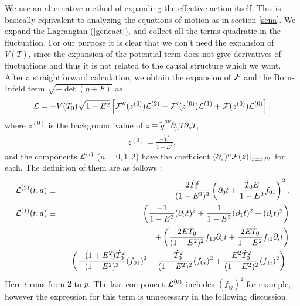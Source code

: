 \documentclass[a4paper,12pt]{article}
\newcommand{\p}{\partial}
\begin{document}
We use an alternative method of expanding the effective action itself. 
This is basically equivalent to analyzing the equations of motion 
as in section \ref{sena}. 
We expand the Lagrangian (\ref{geneact}), and collect all the terms
quadratic in the fluctuation. For our purpose it is clear that we don't
need the expansion of $V(T)$, since the expansion of the potential term
does not give derivatives of fluctuations and thus it is not related to
the causal structure which we want. 
After a straightforward calculation, we
obtain the expansion of ${\cal F}$ and the Born-Infeld term 
$\sqrt{-\det (\eta + F)}$ as
\begin{eqnarray}
 {\cal L} = -V(T_0)\sqrt{1-E^2}
\left[
 {\cal F}''(z^{(0)}) 
{\cal L}^{(2)} 
+ {\cal F}'(z^{(0)}) {\cal L}^{(1)}
+ {\cal F}(z^{(0)}) {\cal L}^{(0)}
\right],
\label{fl2a}
\end{eqnarray}
where $z^{(0)}$ is the background value of 
$z\equiv \widetilde{g}^{\mu\nu} \p_\mu T \p_\nu T$, 
\begin{eqnarray}
 z^{(0)} = \frac{-\dot{T}_0^2}{1-E^2},
\end{eqnarray}
and the components ${\cal L}^{(i)}$ ($n=0,1,2$) have the coefficient
$(\p_z)^n{\cal F}(z)|_{z=z^{(0)}}$ for each. 
The definition of them are as follows : 
\begin{eqnarray}
{\cal L}^{(2)}(t,a) 
& \equiv  &
\frac{2 \dot{T}_0^2}{(1-E^2)^2} \left(
\p_0 t + \frac{\dot{T}_0 E}{1-E^2}f_{01}
\right)^2, 
\label{l2}
\\
{\cal L}^{(1)}(t,a) &\equiv &
\left(
\frac{-1}{1-E^2}(\p_0 t)^2
+ \frac{1}{1-E^2}(\p_1 t)^2
+ (\p_i t)^2
\right) 
\nonumber
\\ 
& & +
\left(\frac{2E\dot{T}_0}{(1-E^2)^2} f_{10} \p_0 t
   +\frac{2E\dot{T}_0}{1-E^2} f_{i1} \p_i t \right)
\label{l1}
\\ 
& & 
+ 
\left(
\frac{-(1+E^2)\dot{T}_0^2}{(1-E^2)^3} (f_{01})^2
+\frac{-\dot{T}_0^2}{(1-E^2)^2} (f_{0i})^2
+\frac{E^2\dot{T}_0^2}{(1-E^2)^2} (f_{1i})^2
\right).
\nonumber
\end{eqnarray}
Here $i$ runs from $2$ to  $p$. 
The last component ${\cal L}^{(0)}$ includes $(f_{ij})^2$ for example,
however the expression for this term is unnecessary in the following
discussion.  
\end{document}
